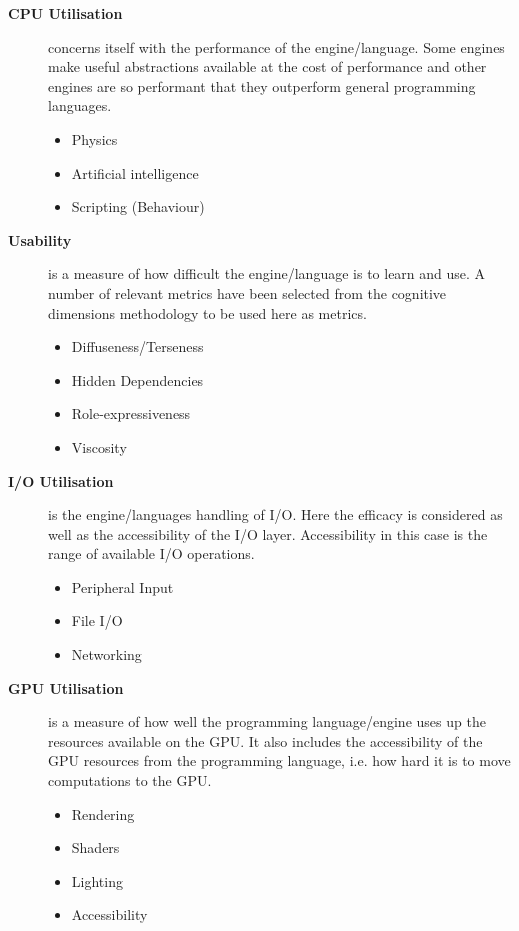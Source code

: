 \begin{description}
    \item[\textbf{\ac{CPU} Utilisation}] concerns itself with the performance of the engine/language. Some engines make useful abstractions available at the cost of performance and other engines are so performant that they outperform general programming languages.
    \begin{itemize}
        \item Physics
        \item Artificial intelligence
        \item Scripting (Behaviour)
    \end{itemize}
    \item[\textbf{Usability}] is a measure of how difficult the engine/language is to learn and use. A number of relevant metrics have been selected from the cognitive dimensions methodology to be used here as metrics.
    \begin{itemize}
        \item Diffuseness/Terseness
        \item Hidden Dependencies
        \item Role-expressiveness
        \item Viscosity 
    \end{itemize}
    \item[\textbf{\ac{I/O} Utilisation}] is the engine/languages handling of \ac{I/O}. Here the efficacy is considered as well as the accessibility of the \ac{I/O} layer. Accessibility in this case is the range of available \ac{I/O} operations.
    \begin{itemize}
        \item Peripheral Input 
        \item File I/O
        \item Networking
    \end{itemize}
    \item[\textbf{\ac{GPU} Utilisation}] is a measure of how well the programming language/engine uses up the resources available on the \ac{GPU}. It also includes the accessibility of the \ac{GPU} resources from the programming language, i.e. how hard it is to move computations to the \ac{GPU}. 
    \begin{itemize}
        \item Rendering
        \item Shaders
        \item Lighting
        \item Accessibility
    \end{itemize}
\end{description}

